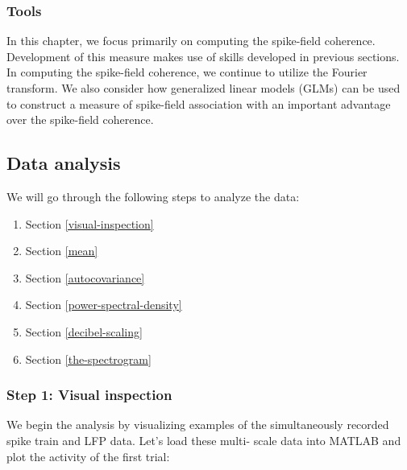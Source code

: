\documentclass[11pt]{article}
\providecommand{\tightlist}{%
      \setlength{\itemsep}{0pt}\setlength{\parskip}{0pt}}
\begin{document}
\subsubsection{Tools}\label{tools}

In this chapter, we focus primarily on computing the spike-field
coherence. Development of this measure makes use of skills developed in
previous sections. In computing the spike-field coherence, we continue
to utilize the Fourier transform. We also consider how generalized
linear models (GLMs) can be used to construct a measure of spike-field
association with an important advantage over the spike-field coherence.

    \subsection{Data analysis}\label{data-analysis}

We will go through the following steps to analyze the data:

\begin{enumerate}
\def\labelenumi{\arabic{enumi}.}
\tightlist
\item
  Section \ref{visual-inspection}
\item
  Section \ref{mean}
\item
  Section \ref{autocovariance}
\item
  Section \ref{power-spectral-density}
\item
  Section \ref{decibel-scaling}
\item
  Section \ref{the-spectrogram}
\end{enumerate}

    \subsubsection{Step 1: Visual
inspection}\label{step-1-visual-inspection}

    We begin the analysis by visualizing examples of the simultaneously
recorded spike train and LFP data. Let's load these multi- scale data
into MATLAB and plot the activity of the first trial:
\end{document}
